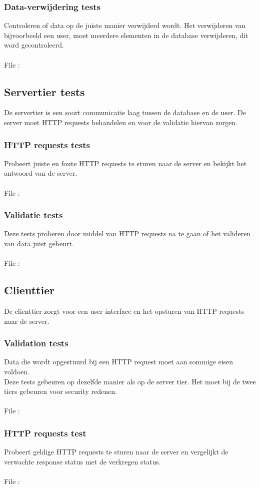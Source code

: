 \documentclass{article}
\begin{document}
\subsubsection{Data-verwijdering tests}
Controleren of data op de juiste manier verwijderd wordt. Het verwijderen van bijvoorbeeld een user, moet meerdere elementen in de database verwijderen, dit word gecontroleerd.
\\
\\
File : 
\subsection{Servertier tests}
De servertier is een soort communicatie laag tussen de database en de user. De server moet HTTP requests behandelen en voor de validatie hiervan zorgen.

\subsubsection{HTTP requests tests}
Probeert juiste en foute HTTP requests te sturen naar de server en bekijkt het antwoord van de server.
\\
\\
File : 
\subsubsection{Validatie tests}
Deze tests proberen door middel van HTTP requests na te gaan of het valideren van data juist gebeurt.
\\
\\
File :
\subsection{Clienttier}
De clienttier zorgt voor een user interface en het opsturen van HTTP requests naar de server. 
\subsubsection{Validation tests}
Data die wordt opgestuurd bij een HTTP request moet aan sommige eisen voldoen.
\\
Deze tests gebeuren op dezelfde manier als op de server tier. Het moet bij de twee tiers gebeuren voor security redenen.
\\
\\
File : %

\subsubsection{HTTP requests test}
Probeert geldige HTTP requests te sturen naar de server en vergelijkt de verwachte response status met de verkregen status. 
\\
\\
File : %
\end{document}
